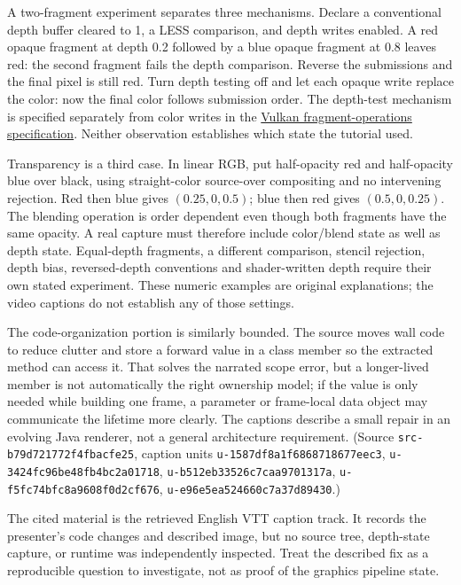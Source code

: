 A two-fragment experiment separates three mechanisms. Declare a conventional depth buffer cleared to 1, a LESS comparison, and depth writes enabled. A red opaque fragment at depth 0.2 followed by a blue opaque fragment at 0.8 leaves red: the second fragment fails the depth comparison. Reverse the submissions and the final pixel is still red. Turn depth testing off and let each opaque write replace the color: now the final color follows submission order. The depth-test mechanism is specified separately from color writes in the \href{https://docs.vulkan.org/spec/latest/chapters/fragops.html\#fragops-depth}{Vulkan fragment-operations specification}. Neither observation establishes which state the tutorial used.

Transparency is a third case. In linear RGB, put half-opacity red and half-opacity blue over black, using straight-color source-over compositing and no intervening rejection. Red then blue gives \((0.25,0,0.5)\); blue then red gives \((0.5,0,0.25)\). The blending operation is order dependent even though both fragments have the same opacity. A real capture must therefore include color/blend state as well as depth state. Equal-depth fragments, a different comparison, stencil rejection, depth bias, reversed-depth conventions and shader-written depth require their own stated experiment. These numeric examples are original explanations; the video captions do not establish any of those settings.

The code-organization portion is similarly bounded. The source moves wall code to reduce clutter and store a forward value in a class member so the extracted method can access it. That solves the narrated scope error, but a longer-lived member is not automatically the right ownership model; if the value is only needed while building one frame, a parameter or frame-local data object may communicate the lifetime more clearly. The captions describe a small repair in an evolving Java renderer, not a general architecture requirement. (Source \texttt{src-b79d721772f4fbacfe25}, caption units \texttt{u-1587df8a1f6868718677eec3}, \texttt{u-3424fc96be48fb4bc2a01718}, \texttt{u-b512eb33526c7caa9701317a}, \texttt{u-f5fc74bfc8a9608f0d2cf676}, \texttt{u-e96e5ea524660c7a37d89430}.)

The cited material is the retrieved English VTT caption track. It records the presenter's code changes and described image, but no source tree, depth-state capture, or runtime was independently inspected. Treat the described fix as a reproducible question to investigate, not as proof of the graphics pipeline state.

